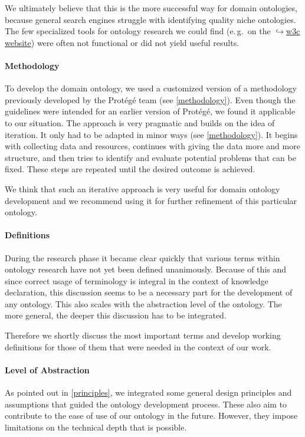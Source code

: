 \documentclass[a4paper, DIV=13, BCOR=0cm]{scrbook}
\newcommand{\eg}{e.\,g.\ }
\newcommand{\link}[2]{\href{#1}{$\hookrightarrow$#2}}
\begin{document}
We ultimately believe that this is the more successful way for domain ontologies, because general search engines struggle with identifying quality niche ontologies. The few specialized tools for ontology research we could find (\eg on the \link{https://www.w3.org/wiki/Search_engines}{\gls{w3c} website}) were often not functional or did not yield useful results.

\paragraph{Methodology}
To develop the domain ontology, we used a customized version of a methodology previously developed by the Protégé team (see \autoref{methodology}). Even though the guidelines were intended for an earlier version of Protégé, we found it applicable to our situation. The approach is very pragmatic and builds on the idea of iteration. It only had to be adapted in minor ways (see \autoref{methodology}). It begins with collecting data and resources, continues with giving the data more and more structure, and then tries to identify and evaluate potential problems that can be fixed. These steps are repeated until the desired outcome is achieved.

We think that such an iterative approach is very useful for domain ontology development and we recommend using it for further refinement of this particular ontology.

\paragraph{Definitions}
During the research phase it became clear quickly that various terms within ontology research have not yet been defined unanimously. Because of this and since correct usage of terminology is integral in the context of knowledge declaration, this discussion seems to be a necessary part for the development of any ontology. This also scales with the abstraction level of the ontology. The more general, the deeper this discussion has to be integrated.

Therefore we shortly discuss the most important terms and develop working definitions for those of them that were needed in the context of our work.

\paragraph{Level of Abstraction}
As pointed out in \autoref{principles}, we integrated some general design principles and assumptions that guided the ontology development process. These also aim to contribute to the ease of use of our ontology in the future. However, they impose limitations on the technical depth that is possible.
\end{document}
